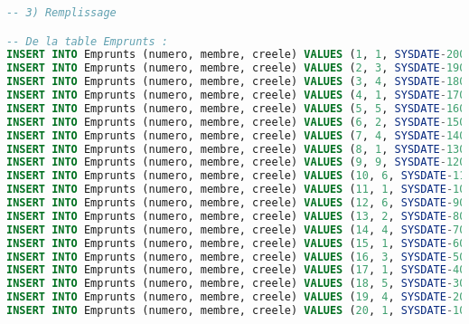 \documentclass[10pt, oneside]{article}
\begin{document}
\begin{lstlisting}[language=sql, title=Question 3, label=QII3]
-- 3) Remplissage

-- De la table Emprunts : 
INSERT INTO Emprunts (numero, membre, creele) VALUES (1, 1, SYSDATE-200);
INSERT INTO Emprunts (numero, membre, creele) VALUES (2, 3, SYSDATE-190);
INSERT INTO Emprunts (numero, membre, creele) VALUES (3, 4, SYSDATE-180);
INSERT INTO Emprunts (numero, membre, creele) VALUES (4, 1, SYSDATE-170);
INSERT INTO Emprunts (numero, membre, creele) VALUES (5, 5, SYSDATE-160);
INSERT INTO Emprunts (numero, membre, creele) VALUES (6, 2, SYSDATE-150);
INSERT INTO Emprunts (numero, membre, creele) VALUES (7, 4, SYSDATE-140);
INSERT INTO Emprunts (numero, membre, creele) VALUES (8, 1, SYSDATE-130);
INSERT INTO Emprunts (numero, membre, creele) VALUES (9, 9, SYSDATE-120);
INSERT INTO Emprunts (numero, membre, creele) VALUES (10, 6, SYSDATE-110);
INSERT INTO Emprunts (numero, membre, creele) VALUES (11, 1, SYSDATE-100);
INSERT INTO Emprunts (numero, membre, creele) VALUES (12, 6, SYSDATE-90);
INSERT INTO Emprunts (numero, membre, creele) VALUES (13, 2, SYSDATE-80);
INSERT INTO Emprunts (numero, membre, creele) VALUES (14, 4, SYSDATE-70);
INSERT INTO Emprunts (numero, membre, creele) VALUES (15, 1, SYSDATE-60);
INSERT INTO Emprunts (numero, membre, creele) VALUES (16, 3, SYSDATE-50);
INSERT INTO Emprunts (numero, membre, creele) VALUES (17, 1, SYSDATE-40);
INSERT INTO Emprunts (numero, membre, creele) VALUES (18, 5, SYSDATE-30);
INSERT INTO Emprunts (numero, membre, creele) VALUES (19, 4, SYSDATE-20);
INSERT INTO Emprunts (numero, membre, creele) VALUES (20, 1, SYSDATE-10);


\end{lstlisting}
\end{document}
